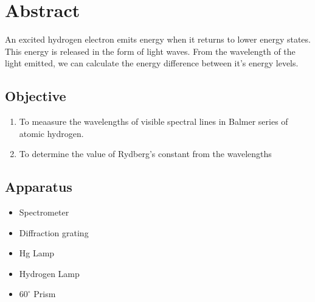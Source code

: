 \section{Abstract}

	An excited hydrogen electron emits energy when it returns to lower energy states. This energy is released in the form of light waves. From the wavelength of the light emitted, we can calculate the energy difference between it's energy levels.

	\subsection{Objective}

		\begin{enumerate}
			\item To meaasure the wavelengths of visible spectral lines in Balmer series of atomic hydrogen.
			\item To determine the value of Rydberg's constant from the wavelengths
		\end{enumerate}

	\subsection{Apparatus}

		\begin{itemize}
			\item Spectrometer
			\item Diffraction grating
			\item Hg Lamp
			\item Hydrogen Lamp
			\item $60^{\circ}$ Prism
		\end{itemize}